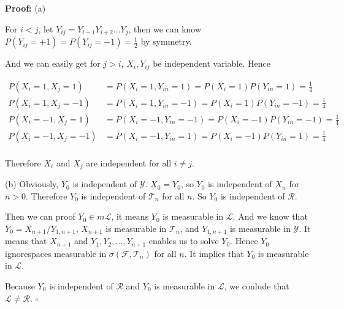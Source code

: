 \documentclass[UTF8, 12pt]{article}
\newenvironment{proof}{\noindent\ignorespaces\textbf{Proof:}}{\hfill $\square$\par\noindent}
\theoremstyle{break}
\begin{document}
    \begin{proof}
        (a)
        
        For $i < j$, let $Y_{ij} = Y_{i+1}Y_{i+2}\dots Y_j$, then we can know 
        $P(Y_{ij} = +1) = P(Y_{ij} = -1) = \frac 1 2$ by symmetry. 
        
        And we can easily get for $j > i$, $X_i, Y_{ij}$ be independent variable.
        Hence

        \begin{align*}
            P(X_i = 1, X_j = 1) &= P(X_i = 1, Y_{in}=1) = P(X_i=1)P(Y_{in}=1) = \frac 1 4 \\
            P(X_i = 1, X_j = -1) &= P(X_i = 1, Y_{in}=-1) = P(X_i=1)P(Y_{in}=-1) = \frac 1 4 \\
            P(X_i = -1, X_j = 1) &= P(X_i = -1, Y_{in}=-1) = P(X_i=-1)P(Y_{in}=-1) = \frac 1 4 \\
            P(X_i = -1, X_j = -1) &= P(X_i = -1, Y_{in}=1) = P(X_i=-1)P(Y_{in}=1) = \frac 1 4 \\
        \end{align*}

        Therefore $X_i$ and $X_j$ are independent for all $i \not= j$.

        \newpage
        (b) Obviously, $Y_0$ is independent of $\mathcal{Y}$. $X_0 = Y_0$, so 
        $Y_0$ is independent of $X_n$ for $n > 0$. Therefore $Y_0$ is independent of
        $\mathcal{T}_n$ for all $n$. So $Y_0$ is independent of $\mathcal{R}$.

        Then we can proof $Y_0 \in m\mathcal{L}$, it means $Y_0$ is measurable in 
        $\mathcal{L}$. And we know that $Y_0 = X_{n+1}/Y_{1,n+1}$, $X_{n+1}$ is measurable
        in $\mathcal{T}_n$, and $Y_{1,n+1}$ is measurable in $\mathcal{Y}$. It means that
        $X_{n+1}$ and $Y_1, Y_2, \dots, Y_{n+1}$ enables us to solve $Y_0$. Hence $Y_0$ ignorespaces
        measurable in $\sigma(\mathcal{F}, \mathcal{T}_n)$ for all $n$. It implies that
        $Y_0$ is measurable in $\mathcal{L}$.

        Because $Y_0$ is independent of $\mathcal{R}$ and $Y_0$ is measurable in $\mathcal{L}$,
        we conlude that $\mathcal{L} \not= \mathcal{R}$.
    \end{proof}
\end{document}
